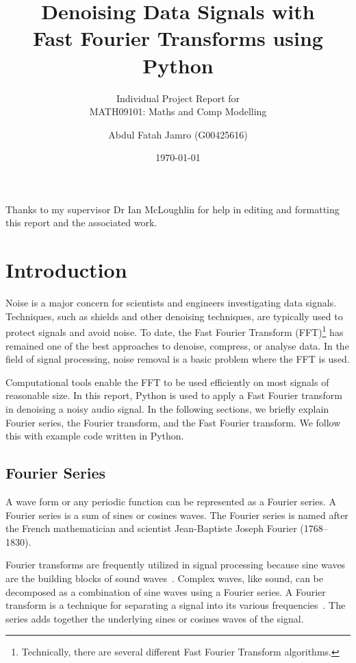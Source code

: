 \documentclass[a4paper, 12pt]{scrartcl}
\title{Denoising Data Signals with\\[2mm] Fast Fourier Transforms using Python}
\subtitle{Individual Project Report for\\[2mm] MATH09101: Maths and Comp Modelling}
\author{Abdul Fatah Jamro {\Large (G00425616})}
\date{\today}
\begin{document}
  
\maketitle

\newpage

\section*{}
Thanks to my supervisor Dr Ian McLoughlin for help in editing and formatting this report and the associated work.

 
\tableofcontents



\newpage

\section{Introduction}

Noise is a major concern for scientists and engineers investigating data signals.
Techniques, such as shields and other denoising techniques, are typically used to protect signals and avoid noise.
To date, the Fast Fourier Transform (FFT)\footnote{Technically, there are several different Fast Fourier Transform algorithms.} has remained one of the best approaches to denoise, compress, or analyse data.
In the field of signal processing, noise removal is a basic problem where the FFT is used.

Computational tools enable the FFT to be used efficiently on most signals of reasonable size.
In this report, Python is used to apply a Fast Fourier transform in denoising a noisy audio signal.
In the following sections, we briefly explain Fourier series, the Fourier transform, and the Fast Fourier transform.
We follow this with example code written in Python. 

\subsection{Fourier Series}
A wave form or any periodic function can be represented as a Fourier series.
A Fourier series is a sum of sines or cosines waves.
The Fourier series is named after the French mathematician and scientist Jean-Baptiste Joseph Fourier (1768--1830).

Fourier transforms are frequently utilized in signal processing because sine waves are the building blocks of sound waves~\cite{tolstov1976fourier}.
Complex waves, like sound, can be decomposed as a combination of sine waves using a Fourier series.
A Fourier transform is a technique for separating a signal into its various frequencies~\cite{tolstov1976fourier}.
The series adds together the underlying sines or cosines waves of the signal.
\end{document}
